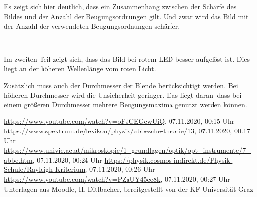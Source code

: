 \documentclass{article}
\begin{document}
Es zeigt sich hier deutlich, dass ein Zusammenhang zwischen der Schärfe des Bildes und der Anzahl der Beugungsordnungen gilt. Und zwar wird das Bild mit der Anzahl der verwendeten Beugungsordnungen schärfer.

~

Im zweiten Teil zeigt sich, dass das Bild bei rotem LED besser aufgelöst ist. Dies liegt an der höheren Wellenlänge vom roten Licht.

Zusätzlich muss auch der Durchmesser der Blende berücksichtigt werden. Bei höheren Durchmesser wird die Unsicherheit geringer. Das liegt daran, dass bei einem größeren Durchmesser mehrere Beugungsmaxima genutzt werden können.









%

%


%


\begin{thebibliography}{9}
 \url{https://www.youtube.com/watch?v=oFJCEGcwUiQ}, 07.11.2020, 00:15 Uhr
 \url{https://www.spektrum.de/lexikon/physik/abbesche-theorie/13}, 07.11.2020, 00:17 Uhr
 \url{https://www.univie.ac.at/mikroskopie/1_grundlagen/optik/opt_instrumente/7_abbe.htm}, 07.11.2020, 00:24 Uhr
 \url{https://physik.cosmos-indirekt.de/Physik-Schule/Rayleigh-Kriterium}, 07.11.2020, 00:26 Uhr
 \url{https://www.youtube.com/watch?v=PZaUY45ce8k}, 07.11.2020, 00:27 Uhr
 Unterlagen aus Moodle, H. Ditlbacher, bereitgestellt von der KF Universität Graz
\end{thebibliography}
\end{document}
